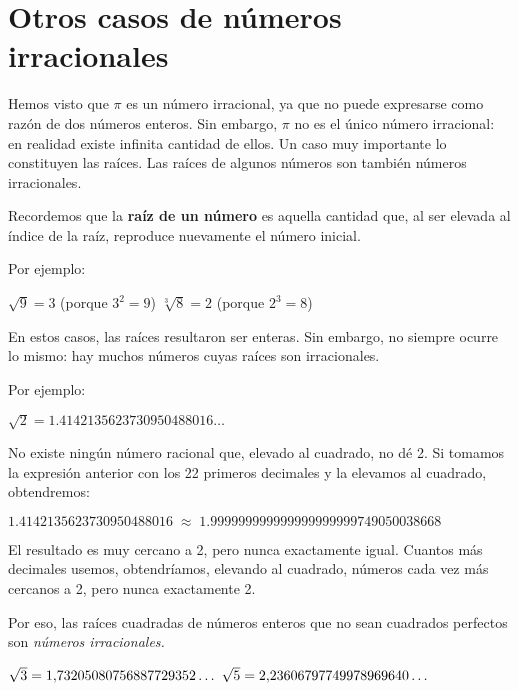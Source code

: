 \section*{Otros casos de números irracionales}
Hemos visto que $\pi$ es un número irracional, ya que no puede expresarse como razón de dos números enteros.
Sin embargo, $\pi$ no es el único número irracional: en realidad existe infinita cantidad de ellos.
Un caso muy importante lo constituyen las raíces. Las raíces de algunos números son también números irracionales.

Recordemos que la \textbf{raíz de un número} es aquella cantidad que, al ser elevada al índice de la raíz, 
reproduce nuevamente el número inicial.  
\clearpage

Por ejemplo:

\begin{ejemplos}[2][\textbullet]
  \task $\sqrt{9}=3$ \quad (porque $3^2=9$)
  \task $\sqrt[3]{8}=2$ \quad (porque $2^3=8$)
\end{ejemplos}



En estos casos, las raíces resultaron ser enteras.  
Sin embargo, no siempre ocurre lo mismo: hay muchos números cuyas raíces son irracionales.  

Por ejemplo:

\begin{ejemplos}[1][\textbullet]
  \task $\sqrt{2} = \num{1.4142135623730950488016}\ldots$
\end{ejemplos}


No existe ningún número racional que, elevado al cuadrado, no dé 2.  Si tomamos la expresión
anterior con los 22 primeros decimales y la elevamos al cuadrado, obtendremos:

\begin{ejemplos}[1][\textbullet]
  \task $1.4142135623730950488016 \;\approx\; 1.999999999999999999999749050038668$
\end{ejemplos}

El resultado es muy cercano a 2, pero nunca exactamente igual.  
Cuantos más decimales usemos, obtendríamos, elevando al cuadrado, números cada vez más cercanos
a 2, pero nunca exactamente 2.  

Por eso, las raíces cuadradas de números enteros que no sean cuadrados perfectos son \textit{números irracionales.} 

\begin{ejemplos}[2][\textbullet]
  \task $\sqrt{3} = \numes{1.73205080756887729352}\ldots$
  \task $\sqrt{5} = \numes{2.23606797749978969640}\ldots$
\end{ejemplos}


